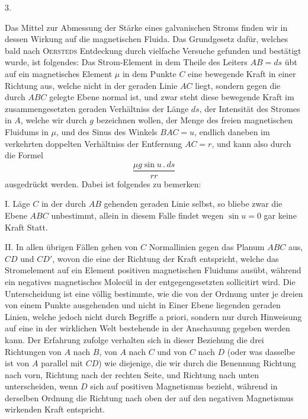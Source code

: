 \begin{center}3.\end{center}
\noindent\hspace*{\parindent}Das Mittel zur Abmessung der Stärke eines galvanischen Stroms finden wir in dessen Wirkung auf die magnetischen Fluida. Das Grundgesetz dafür, welches bald nach \textsc{Oersteds} Entdeckung durch vielfache Versuche gefunden und bestätigt wurde, ist folgendes: Das Strom-Element in dem Theile des Leiters $AB=ds$ übt auf ein magnetisches Element $\mu$ in dem Punkte $C$ eine bewegende Kraft in einer Richtung aus, welche nicht in der geraden Linie $AC$ liegt, sondern gegen die durch $ABC$ gelegte Ebene normal ist, und zwar steht diese bewegende Kraft im zusammengesetzten geraden Verhältniss der Länge $ds$, der Intensität des Stromes in $A$, welche wir durch $g$ bezeichnen wollen, der Menge des freien magnetischen Fluidums in $\mu$, und des Sinus des Winkels $BAC=u$, endlich daneben im verkehrten doppelten Verhältniss der Entfernung $AC=r$, und kann also durch die Formel
\[
\frac{\mu g\sin u\mathbin{.}ds}{rr}
\]
\noindent ausgedrückt werden. Dabei ist folgendes zu bemerken:

I. Läge $C$ in der durch $AB$ gehenden geraden Linie selbst, so bliebe zwar die Ebene $ABC$ unbestimmt, allein in diesem Falle findet wegen $\sin u=0$ gar keine Kraft Statt.

II. In allen übrigen Fällen gehen von $C$  Normallinien gegen das Planum $ABC$ aus, $CD$ und $CD'$, wovon die eine der Richtung der Kraft entspricht, welche das Stromelement auf ein Element positiven magnetischen Fluidums ausübt, während ein negatives magnetisches Molecül in der entgegengesetzten sollicitirt wird. Die Unterscheidung ist eine völlig bestimmte, wie die von der Ordnung unter je dreien von einem Punkte ausgehenden und nicht in Einer Ebene liegenden geraden Linien, welche jedoch nicht durch Begriffe a priori, sondern nur durch Hinweisung auf eine in der wirklichen Welt bestehende in der Anschauung gegeben werden kann. Der Erfahrung
\HistoricalFoot{}{23\textsuperscript{*}}
\clearpage{}
\noindent zufolge verhalten sich in dieser Beziehung die drei Richtungen von $A$ nach $B$, von $A$ nach $C$ und von $C$ nach $D$ (oder was dasselbe ist von $A$ parallel mit $CD$) wie diejenige, die wir durch die Benennung Richtung nach vorn, Richtung nach der rechten Seite, und Richtung nach unten unterscheiden, wenn $D$ sich auf positiven Magnetismus bezieht, während in derselben Ordnung die Richtung nach oben der auf den negativen Magnetismus wirkenden Kraft entspricht.

